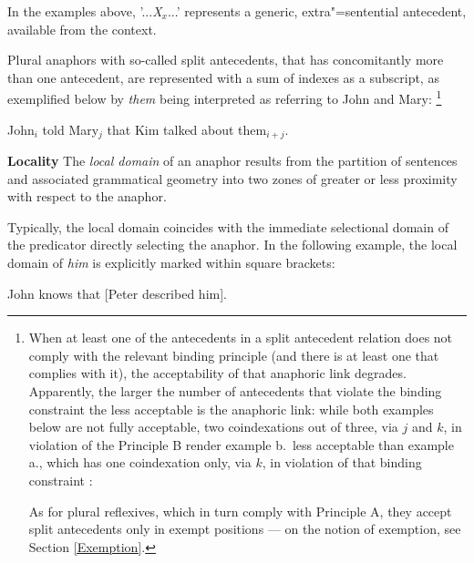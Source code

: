 \documentclass[output=paper
,modfonts
,nonflat]{langsci/langscibook}
\begin{document}
In the examples above, '...{\em X}$_{x}$...' represents a generic, extra"=sentential
antecedent, available from the context.

Plural anaphors with so-called split antecedents, that has concomitantly
more than one antecedent, are represented with a sum of indexes as a subscript, as exemplified
below by {\em them} being interpreted as referring to John and Mary:%
\footnote{
When at least one of the antecedents in a split antecedent relation does not comply
with the relevant binding principle (and there is at least one that complies with it), 
the acceptability of that anaphoric link degrades. Apparently, the larger the number 
of antecedents that violate the binding constraint the less acceptable
is the anaphoric link: while both examples below are not fully acceptable,
two coindexations out of three, via $j$ and $k$,  in violation of the Principle B
render example b.~less acceptable than example a., which has one coindexation 
only, via $k$, in violation of that binding constraint  \citep[313]{seeley93}:

\begin{exe}
\ex
\begin{xlist}
\end{xlist}
\end{exe}

As for plural reflexives, which in turn comply with Principle A, they accept split antecedents only in exempt 
positions --- on the notion of exemption, see Section \ref{Exemption}.}

\begin{exe}
\ex John$_{i}$ told Mary$_{j}$ that Kim talked about them$_{i+j}$.
\end{exe}


\textbf{Locality} The {\em local domain} of an anaphor results from
the partition of sentences and associated grammatical geometry into two
zones of greater or less proximity with respect to the anaphor.

Typically, the local domain coincides with the immediate selectional domain
of the predicator directly selecting the anaphor. In the following example, 
the local domain of {\em him} is explicitly marked within square brackets: 


\begin{exe}
\ex John knows that [Peter described him].
\end{exe}
\end{document}

